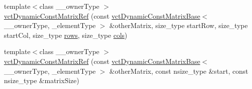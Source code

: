 {\bf }\par
\begin{DoxyCompactItemize}
\item 
{\footnotesize template$<$class \+\_\+\+\_\+owner\+Type $>$ }\\\hyperlink{classvct_dynamic_const_matrix_ref_ae25ab4bdd7ef6a015128445886601545}{vct\+Dynamic\+Const\+Matrix\+Ref} (const \hyperlink{classvct_dynamic_const_matrix_base}{vct\+Dynamic\+Const\+Matrix\+Base}$<$ \+\_\+\+\_\+owner\+Type, \+\_\+element\+Type $>$ \&other\+Matrix, size\+\_\+type start\+Row, size\+\_\+type start\+Col, size\+\_\+type \hyperlink{classvct_dynamic_const_matrix_base_a5eac13be2207ebeb8766cde379d73438}{rows}, size\+\_\+type \hyperlink{classvct_dynamic_const_matrix_base_aa6c51d41a100da49a7e7ac7edb20ecd9}{cols})
\item 
{\footnotesize template$<$class \+\_\+\+\_\+owner\+Type $>$ }\\\hyperlink{classvct_dynamic_const_matrix_ref_acb86d5a9ab887009576c09c2558adfa4}{vct\+Dynamic\+Const\+Matrix\+Ref} (const \hyperlink{classvct_dynamic_const_matrix_base}{vct\+Dynamic\+Const\+Matrix\+Base}$<$ \+\_\+\+\_\+owner\+Type, \+\_\+element\+Type $>$ \&other\+Matrix, const nsize\+\_\+type \&start, const nsize\+\_\+type \&matrix\+Size)
\end{DoxyCompactItemize}

